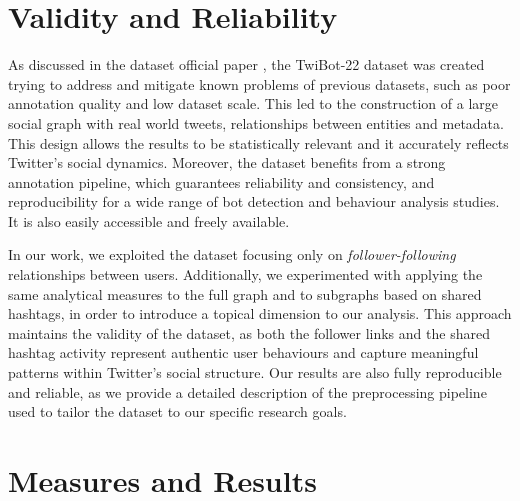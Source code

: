 \documentclass[12pt, a4paper]{article}
\begin{document}
\section{Validity and Reliability}
	\label{validity-and-reliability-not-needed-for-the-project-proposal}
	
   As discussed in the dataset official paper \cite{twibot22}, the TwiBot-22 dataset was created trying to address and mitigate known problems of previous datasets, such as poor annotation quality and low dataset scale. This led to the construction of a large social graph with real world tweets, relationships between entities and metadata. This design allows the results to be statistically relevant and it accurately reflects Twitter’s social dynamics. Moreover, the dataset benefits from a strong annotation pipeline, which guarantees reliability and consistency, and reproducibility for a wide range of bot detection and behaviour analysis studies. It is also easily accessible and freely available.
   \vspace{0.1cm}
	
    In our work, we exploited the dataset focusing only on \textit{follower-following} relationships between users. Additionally, we experimented with applying the same analytical measures to the full graph and to subgraphs based on shared hashtags, in order to introduce a topical dimension to our analysis. This approach maintains the validity of the dataset, as both the follower links and the shared hashtag activity represent authentic user behaviours and capture meaningful patterns within Twitter’s social structure. Our results are also fully reproducible and reliable, as we provide a detailed description of the preprocessing pipeline used to tailor the dataset to our specific research goals.


\section{Measures and Results}
	\label{measures}
	
	
\end{document}
